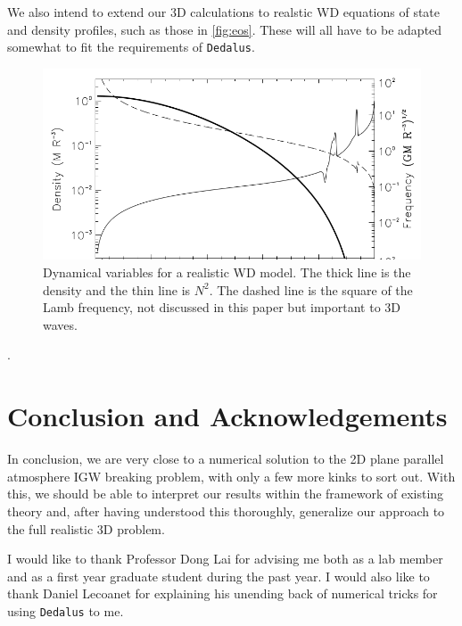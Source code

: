 \documentclass[11pt,
        usenames, %
        dvipsnames %
    ]{article}
\begin{document}
We also intend to extend our 3D calculations to realstic WD equations of state
and density profiles\cite{fullerI}, such as those in \autoref{fig:eos}.
These will all have to be adapted somewhat to fit the requirements of
\lstinline{Dedalus}.
\begin{figure}[t]
    \centering
    \includegraphics[width=\textwidth]{figs/fuller_eos.png}
    \caption{Dynamical variables for a realistic WD model. The thick line is the
    density and the thin line is $N^2$. The dashed line is the square of the
    Lamb frequency, not discussed in this paper but important to 3D
    waves.}\label{fig:eos}
\end{figure}.

\section{Conclusion and Acknowledgements}

In conclusion, we are very close to a numerical solution to the 2D plane
parallel atmosphere IGW breaking problem, with only a few more kinks to sort
out. With this, we should be able to interpret our results within the framework
of existing theory and, after having understood this thoroughly, generalize our
approach to the full realistic 3D problem.

I would like to thank Professor Dong Lai for advising me both as a lab member
and as a first year graduate student during the past year. I would also like to
thank Daniel Lecoanet for explaining his unending back of numerical tricks for
using \lstinline{Dedalus} to me.

\clearpage

\renewcommand{\bibname}{References}
{\scriptsize }
\end{document}
